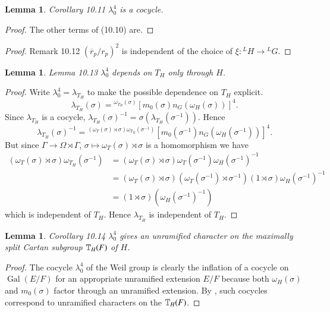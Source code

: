 \documentclass[11pt]{amsart}
\theoremstyle{plain}
\newtheorem{lemma}[theorem]{Lemma}
\theoremstyle{definition}
\def\Gal{\operatorname{\text{Gal}}}          %
\def\LABESSEC{19}
\begin{document}
\begin{lemma}{Corollary 10.11}  $\lambda_0^4$ is a cocycle.
\end{lemma}

\begin{proof}  The other terms of (10.10) are.
\end{proof}

\begin{proof}{Remark 10.12}  $(\overline r_p/r_p)^2$
is independent of the choice of $\xi:{}^LH\to {}^LG$.
\end{proof}

\begin{lemma}{Lemma 10.13}  $\lambda_0^4$ depends on $T_H$ only through $H$.
\end{lemma}

\begin{proof}  
Write $\lambda_0^4 = \lambda_{T_H}$ to make the possible dependence on $T_H$
explicit.
$$\lambda_{T_H}(\sigma) = {}^{\omega_{T_H}(\sigma)}\left[m_0(\sigma)n_G(\omega_H(\sigma))\right]^4.$$
Since $\lambda_{T_H}$ is a cocycle, 
$\lambda_{T_H}(\sigma)^{-1} = \sigma(\lambda_{T_H}(\sigma^{-1}))$.  Hence
$$\lambda_{T_H}(\sigma)^{-1}= {}^{(\omega_T(\sigma)\rtimes \sigma)\omega_{T_H}(\sigma^{-1})}
  \left[m_0(\sigma^{-1})n_G(\omega_H(\sigma^{-1}))\right]^4.$$
But since $\Gamma \to\Omega\rtimes\Gamma$, $\sigma\mapsto \omega_T(\sigma)\rtimes \sigma$ is
a homomorphism we have
$$\begin{array}{lll}
	(\omega_T(\sigma)\rtimes \sigma)\omega_{T_H}(\sigma^{-1}) &=
	(\omega_T(\sigma)\rtimes \sigma)\omega_T(\sigma^{-1})\omega_H(\sigma^{-1})^{-1} \\
	&=
	(\omega_T(\sigma)\rtimes \sigma)(\omega_T(\sigma^{-1})\rtimes \sigma^{-1})(1\rtimes \sigma)
		\omega_H(\sigma^{-1})^{-1} \\ &=
	(1\rtimes\sigma)(\omega_H(\sigma^{-1})^{-1})\end{array}
$$
which is independent of $T_H$. Hence $\lambda_{T_H}$ is independent of $T_H$.
\end{proof}

\begin{lemma}{Corollary 10.14}  $\lambda_0^4$ gives an unramified
character on the maximally split Cartan subgroup $\Bbb T_H(F)$ of $H$.
\end{lemma}

\begin{proof}  The cocycle $\lambda_0^4$ of the Weil group is
clearly the inflation of a cocycle on $\Gal(E/F)$ for an
appropriate unramified extension $E/F$ because both $\omega_H(\sigma)$
and $m_0(\sigma)$ factor through an unramified extension.  By \cite{\LABESSEC},
 such cocycles correspond to unramified
characters on the $\Bbb T_H(F)$.  
\end{proof}
\end{document}
